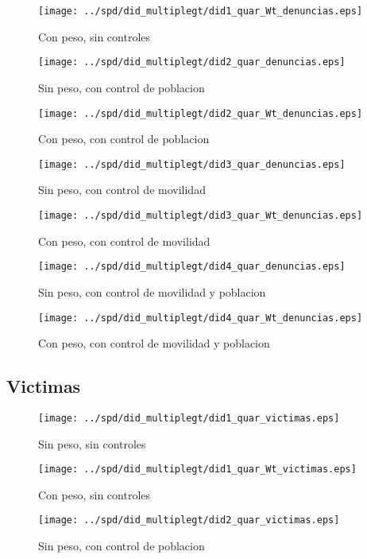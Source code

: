 \documentclass[11pt,letterpaper]{article}
\begin{document}
\begin{figure}[hbtp]
\caption{Con peso, sin controles}
\centering
\texttt{[image: ../spd/did\_multiplegt/did1\_quar\_Wt\_denuncias.eps]}
\end{figure}
\begin{figure}[hbtp]
\caption{Sin peso, con control de poblacion}
\centering
\texttt{[image: ../spd/did\_multiplegt/did2\_quar\_denuncias.eps]}
\end{figure}

\begin{figure}[hbtp]
\caption{Con peso, con control de poblacion}
\centering
\texttt{[image: ../spd/did\_multiplegt/did2\_quar\_Wt\_denuncias.eps]}
\end{figure}
\begin{figure}[hbtp]
\caption{Sin peso, con control de movilidad}
\centering
\texttt{[image: ../spd/did\_multiplegt/did3\_quar\_denuncias.eps]}
\end{figure}

\begin{figure}[hbtp]
\caption{Con peso, con control de movilidad}
\centering
\texttt{[image: ../spd/did\_multiplegt/did3\_quar\_Wt\_denuncias.eps]}
\end{figure}
\begin{figure}[hbtp]
\caption{Sin peso, con control de movilidad y poblacion}
\centering
\texttt{[image: ../spd/did\_multiplegt/did4\_quar\_denuncias.eps]}
\end{figure}

\begin{figure}[hbtp]
\caption{Con peso, con control de movilidad y poblacion}
\centering
\texttt{[image: ../spd/did\_multiplegt/did4\_quar\_Wt\_denuncias.eps]}
\end{figure}

	\subsection{Victimas}
\begin{figure}[hbtp]
\caption{Sin peso, sin controles}
\centering
\texttt{[image: ../spd/did\_multiplegt/did1\_quar\_victimas.eps]}
\end{figure}

\begin{figure}[hbtp]
\caption{Con peso, sin controles}
\centering
\texttt{[image: ../spd/did\_multiplegt/did1\_quar\_Wt\_victimas.eps]}
\end{figure}
\begin{figure}[hbtp]
\caption{Sin peso, con control de poblacion}
\centering
\texttt{[image: ../spd/did\_multiplegt/did2\_quar\_victimas.eps]}
\end{figure}
\end{document}
